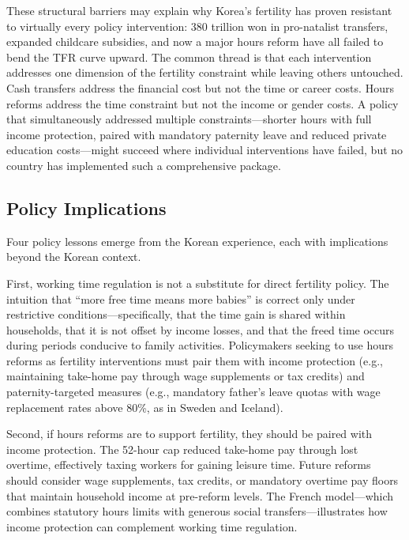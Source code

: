 \documentclass[12pt]{article}
\begin{document}
These structural barriers may explain why Korea's fertility has proven resistant to virtually every policy intervention: 380 trillion won in pro-natalist transfers, expanded childcare subsidies, and now a major hours reform have all failed to bend the TFR curve upward. The common thread is that each intervention addresses one dimension of the fertility constraint while leaving others untouched. Cash transfers address the financial cost but not the time or career costs. Hours reforms address the time constraint but not the income or gender costs. A policy that simultaneously addressed multiple constraints---shorter hours with full income protection, paired with mandatory paternity leave and reduced private education costs---might succeed where individual interventions have failed, but no country has implemented such a comprehensive package.

\subsection{Policy Implications}

Four policy lessons emerge from the Korean experience, each with implications beyond the Korean context.

First, working time regulation is not a substitute for direct fertility policy. The intuition that ``more free time means more babies'' is correct only under restrictive conditions---specifically, that the time gain is shared within households, that it is not offset by income losses, and that the freed time occurs during periods conducive to family activities. Policymakers seeking to use hours reforms as fertility interventions must pair them with income protection (e.g., maintaining take-home pay through wage supplements or tax credits) and paternity-targeted measures (e.g., mandatory father's leave quotas with wage replacement rates above 80\%, as in Sweden and Iceland).

Second, if hours reforms are to support fertility, they should be paired with income protection. The 52-hour cap reduced take-home pay through lost overtime, effectively taxing workers for gaining leisure time. Future reforms should consider wage supplements, tax credits, or mandatory overtime pay floors that maintain household income at pre-reform levels. The French model---which combines statutory hours limits with generous social transfers---illustrates how income protection can complement working time regulation.
\end{document}

